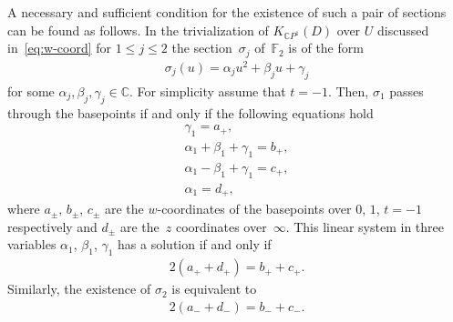 \documentclass[10pt,a4paper]{amsart}
\newcommand{\CP}[1]{\mathbb{C}P^{#1}} %
\numberwithin{equation}{section}
\begin{document}
\begin{Example}
A necessary and sufficient condition for the existence of such a pair of sections can be found as follows. In the trivialization {of $K_{\CP1}(D)$ over $U$}
discussed {in~\eqref{eq:w-coord}} %
for $1\leq j \leq 2$ the section~$\sigma_j$ of~${\mathbb {F}}_2$ is of the form
\begin{gather*}
 \sigma_j (u) = \alpha_j u^2 + \beta_j u + \gamma_j
\end{gather*}
for some $\alpha_j ,\beta_j ,\gamma_j \in\mathbb{C}$. For simplicity assume that $t = -1$.
Then, $\sigma_1$ passes through the basepoints if and only if the following equations hold
\begin{gather*}
 \gamma_1 = a_+, \\
 \alpha_1 + \beta_1 + \gamma_1 = b_+, \\
 \alpha_1 - \beta_1 + \gamma_1 = c_+, \\
 \alpha_1 = d_+,
\end{gather*}
where $a_{\pm}$, $b_{\pm}$, $c_{\pm}$ are the $w$-coordinates of
the basepoints over $0$, $1$, $t=-1$ respectively and $d_{\pm}$ are the~$z$ coordinates over~$\infty$.
This linear system
in three variables $\alpha_1$, $\beta_1$, $\gamma_1$ has a solution if and
only if
\begin{gather*}
 2(a_+ + d_+ ) = b_+ + c_+.
\end{gather*}
Similarly, the existence of $\sigma_2$ is equivalent to
\begin{gather*}
 2(a_- + d_- ) = b_- + c_-.
\end{gather*}


\end{Example}
\end{document}
